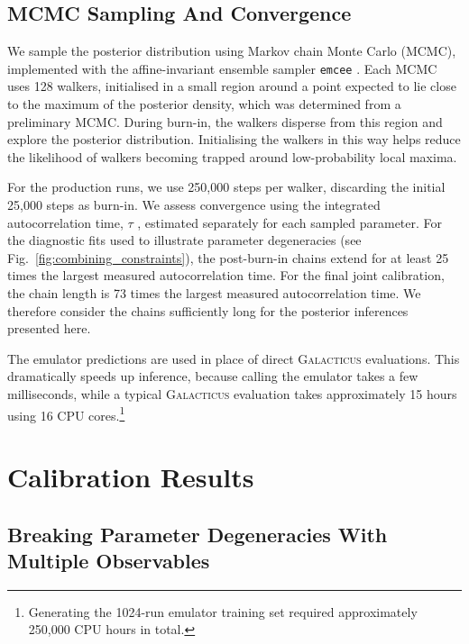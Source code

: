 \documentclass[twocolumn, apj, numberedappendix, iop]{openjournal}
\newcommand{\galacticus}{\textsc{Galacticus}\xspace}
\newcommand{\emcee}{\texttt{emcee}}
\begin{document}
\subsection{MCMC Sampling And Convergence}
\label{sec:mcmc-sampling}

We sample the posterior distribution using Markov chain Monte Carlo (MCMC), implemented with the affine-invariant ensemble sampler \emcee{} \citep{ForemanMackey:2013io}.
Each MCMC uses 128 walkers, initialised in a small region around a point expected to lie close to the maximum of the posterior density, which was determined from a preliminary MCMC.
During burn-in, the walkers disperse from this region and explore the posterior distribution. Initialising the walkers in this way helps reduce the likelihood of walkers becoming trapped around low-probability local maxima.

For the production runs, we use 250,000 steps per walker, discarding the initial 25,000 steps as burn-in.
We assess convergence using the integrated autocorrelation time, $\tau$ \citep{Sokal1997}, estimated separately for each sampled parameter.
For the diagnostic fits used to illustrate parameter degeneracies (see Fig.~\ref{fig:combining_constraints}), the post-burn-in chains extend for at least 25 times the largest measured autocorrelation time.
For the final joint calibration, the chain length is 73 times the largest measured autocorrelation time.
We therefore consider the chains sufficiently long for the posterior inferences presented here.

The emulator predictions are used in place of direct \galacticus{} evaluations.
This dramatically speeds up inference, because calling the emulator takes a few milliseconds, while a typical \galacticus{} evaluation takes approximately 15 hours using 16 CPU cores.\footnote{Generating the 1024-run emulator training set required approximately 250,000 CPU hours in total.}

\section{Calibration Results}
\label{sec:calibration-results}

\subsection{Breaking Parameter Degeneracies With Multiple Observables}
\label{sec:degeneracy-breaking}
\end{document}
